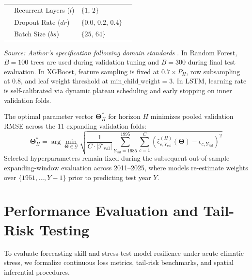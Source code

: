 \begin{table}[htbp]
\begin{tabularx}{\textwidth}{l p{4.0cm} X c}
 & Recurrent Layers ($l$) & $\{1, \, 2\}$ & \\
 & Dropout Rate ($dr$) & $\{0.0, \, 0.2, \, 0.4\}$ & \\
 & Batch Size ($bs$) & $\{25, \, 64\}$ & \\
\bottomrule
\end{tabularx}
\vspace{0.2em}
{\footnotesize \textit{Source: Author's specification following domain standards \citep{Torsonietal2023, Sharmaetal2025, Geron2025}}. In Random Forest, $B=100$ trees are used during validation tuning and $B=300$ during final test evaluation. In XGBoost, feature sampling is fixed at $0.7 \times P_H$, row subsampling at $0.8$, and leaf weight threshold at $\text{min\_child\_weight}=3$. In LSTM, learning rate is self-calibrated via dynamic plateau scheduling and early stopping on inner validation folds.}
\end{table}

The optimal parameter vector $\mathbf{\Theta}_H^*$ for horizon $H$ minimizes pooled validation RMSE across the 11 expanding validation folds:
\begin{equation}
    \mathbf{\Theta}_H^* = \arg\min_{\mathbf{\Theta} \in \mathcal{G}} \sqrt{\frac{1}{C \cdot |\mathcal{T}_{\text{val}}|} \sum_{Y_{\text{val}}=1985}^{1995} \sum_{c=1}^C \left( \hat{\epsilon}_{c,Y_{\text{val}}}^{(H)}(\mathbf{\Theta}) - \epsilon_{c,Y_{\text{val}}} \right)^2}
    \label{eq:inner_val_selection}
\end{equation}
Selected hyperparameters remain fixed during the subsequent out-of-sample expanding-window evaluation across 2011--2025, where models re-estimate weights over $\{1951, \dots, Y-1\}$ prior to predicting test year $Y$.


\section{Performance Evaluation and Tail-Risk Testing}
\label{sec:meth_evaluation}

To evaluate forecasting skill and stress-test model resilience under acute climatic stress, we formalize continuous loss metrics, tail-risk benchmarks, and spatial inferential procedures.

